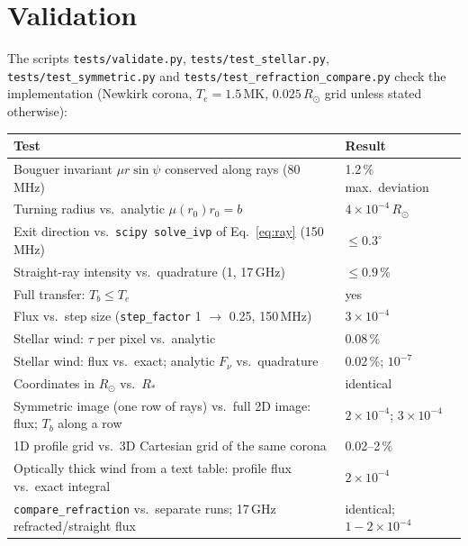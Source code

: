 \documentclass[11pt,a4paper]{article}
\newcommand{\code}[1]{\texttt{#1}}
\newcommand{\rsun}{R_\odot}
\begin{document}
\section{Validation}\label{sec:validation}

The scripts \code{tests/validate.py}, \code{tests/test\_stellar.py},
\code{tests/test\_symmetric.py} and \code{tests/test\_refraction\_compare.py} check the
implementation (Newkirk corona, $T_e=1.5$\,MK, $0.025\,\rsun$ grid unless stated otherwise):

\begin{center}
\small
\begin{tabular}{@{}p{10.6cm} l@{}}
\toprule
Test & Result \\
\midrule
Bouguer invariant $\mu r\sin\psi$ conserved along rays (80\,MHz) & 1.2\,\% max.\ deviation \\
Turning radius vs.\ analytic $\mu(r_0)r_0=b$ & $4\times10^{-4}\,\rsun$ \\
Exit direction vs.\ \code{scipy solve\_ivp} of Eq.~\eqref{eq:ray} (150\,MHz) & $\le0.3^\circ$ \\
Straight-ray intensity vs.\ quadrature (1, 17\,GHz) & $\le0.9\,\%$ \\
Full transfer: $T_b\le T_e$ & yes \\
Flux vs.\ step size (\code{step\_factor} 1 $\to$ 0.25, 150\,MHz) & $3\times10^{-4}$ \\
Stellar wind: $\tau$ per pixel vs.\ analytic & 0.08\,\% \\
Stellar wind: flux vs.\ exact; analytic $F_\nu$ vs.\ quadrature & 0.02\,\%; $10^{-7}$ \\
Coordinates in $\rsun$ vs.\ $R_\ast$ & identical \\
Symmetric image (one row of rays) vs.\ full 2D image: flux; $T_b$ along a row & $2\times10^{-4}$; $3\times10^{-4}$ \\
1D profile grid vs.\ 3D Cartesian grid of the same corona & 0.02--2\,\% \\
Optically thick wind from a text table: profile flux vs.\ exact integral & $2\times10^{-4}$ \\
\code{compare\_refraction} vs.\ separate runs; 17\,GHz refracted/straight flux & identical; $1-2\times10^{-4}$ \\
\bottomrule
\end{tabular}
\end{center}
\end{document}
